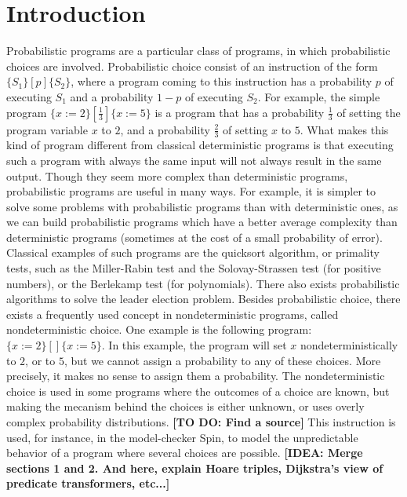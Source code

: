 \documentclass[a4paper,10pt]{llncs}
\newcommand\todo[1]{{\color{red}\textbf{[TO DO:  #1]}}}
\newcommand\idea[1]{{\color{purple}\textbf{[IDEA:  #1]}}}
\begin{document}
\section{Introduction}
\label{sec:intro}
Probabilistic programs are a particular class of programs, in which probabilistic choices are involved. Probabilistic choice consist of an instruction of the form $\{S_1\} [p] \{S_2\}$, where a program coming to this instruction has a probability $p$ of executing $S_1$ and a probability $1-p$ of executing $S_2$. For example, the simple program $\{ x := 2 \} [\frac{1}{3}] \{ x := 5 \}$ is a program that has a probability $\frac{1}{3}$ of setting the program variable $x$ to $2$, and a probability $\frac{2}{3}$ of setting $x$ to $5$. What makes this kind of program different from classical deterministic programs is that executing such a program with always the same input will not always result in the same output. Though they seem more complex than deterministic programs, probabilistic programs are useful in many ways. For example, it is simpler to solve some problems with probabilistic programs than with deterministic ones, as we can build probabilistic programs which have a better average complexity than deterministic programs (sometimes at the cost of a small probability of error). Classical examples of such programs are the quicksort algorithm, or primality tests, such as the Miller-Rabin test and the Solovay-Strassen test (for positive numbers), or the Berlekamp test (for polynomials). There also exists probabilistic algorithms to solve the leader election problem.\newline 
Besides probabilistic choice, there exists a frequently used concept in nondeterministic programs, called nondeterministic choice. One example is the following program: $\{ x := 2 \} [\!] \{ x := 5 \}$. In this example, the program will set $x$ nondeterministically to $2$, or to $5$, but we cannot assign a probability to any of these choices. More precisely, it makes no sense to assign them a probability. The nondeterministic choice is used in some programs where the outcomes of a choice are known, but making the mecanism behind the choices is either unknown, or uses overly complex probability distributions. \todo{Find a source} This instruction is used, for instance, in the model-checker Spin, to model the unpredictable behavior of a program where several choices are possible.\newline
\idea{Merge sections 1 and 2. And here, explain Hoare triples, Dijkstra's view of predicate transformers, etc...}
\end{document}
